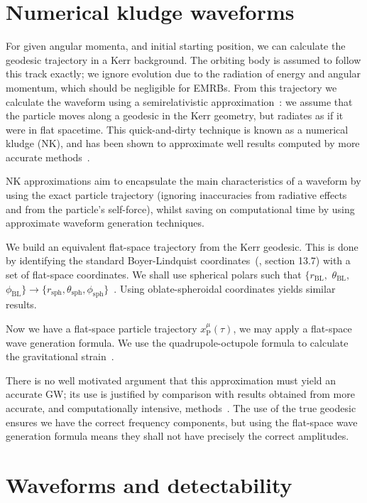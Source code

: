 \documentclass[11pt,twoside]{article}
\begin{document}
\section{Numerical kludge waveforms}

For given angular momenta, and initial starting position, we can calculate the geodesic trajectory in a Kerr background. The orbiting body is assumed to follow this track exactly; we ignore evolution due to the radiation of energy and angular momentum, which should be negligible for EMRBs. From this trajectory we calculate the waveform using a semirelativistic approximation~\citep{Ruffini1981}: we assume that the particle moves along a geodesic in the Kerr geometry, but radiates as if it were in flat spacetime. This quick-and-dirty technique is known as a numerical kludge (NK), and has been shown to approximate well results computed by more accurate methods~\citep{Babak2007}.

NK approximations aim to encapsulate the main characteristics of a waveform by using the exact particle trajectory (ignoring inaccuracies from radiative effects and from the particle's self-force), whilst saving on computational time by using approximate waveform generation techniques.

We build an equivalent flat-space trajectory from the Kerr geodesic. This is done by identifying the standard Boyer-Lindquist coordinates~(\citealt*{Boyer1967, Hobson2006}, section 13.7) with a set of flat-space coordinates. We shall use spherical polars such that $\{r_\mathrm{BL},$ $\theta_\mathrm{BL},$ $\phi_\mathrm{BL}\} \rightarrow \{r_\mathrm{sph}, \theta_\mathrm{sph}, \phi_\mathrm{sph}\}$~\citep{Gair2005, Babak2007}. Using oblate-spheroidal coordinates yields similar results.

Now we have a flat-space particle trajectory $x_\mathrm{P}^\mu(\tau)$, we may apply a flat-space wave generation formula. We use the quadrupole-octupole formula to calculate the gravitational strain~\citep{Bekenstein1973, Press1977, Yunes2008}.

There is no well motivated argument that this approximation must yield an accurate GW; its use is justified by comparison with results obtained from more accurate, and computationally intensive, methods~\citep{Gair2005, Babak2007}. The use of the true geodesic ensures we have the correct frequency components, but using the flat-space wave generation formula means they shall not have precisely the correct amplitudes. 

\section{Waveforms and detectability}\label{sec:Waveforms}
\end{document}
